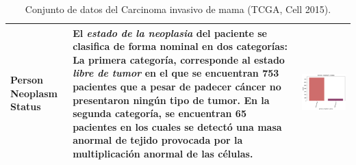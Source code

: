 \begin{table}[!htb]
\begin{threeparttable}
\begin{tabular}{p{2.5cm} p{7cm} p{6.5cm}}
			Person Neoplasm Status
			& El \textit{estado de la neoplasia} del paciente se clasifica de forma nominal en dos categorías: La primera categoría, corresponde al estado \textit{libre de tumor} en el que se encuentran 753 pacientes que a pesar de padecer cáncer no presentaron ningún tipo de tumor. En la segunda categoría, se encuentran 65 pacientes en los cuales se detectó una masa anormal de tejido provocada por la multiplicación anormal de las células.
			& \begin{center}\includegraphics[width=1\linewidth]{NOTEBOOK/IMAGENES_DESCRIPTIVAS/43_person_neoplasm_status}\end{center}
			\\ \hline
		\end{tabular}
		\caption{Conjunto de datos del Carcinoma invasivo de mama (TCGA, Cell 2015).}
		\label{Analisis_Descriptivo}
	\end{threeparttable}
\end{table}

